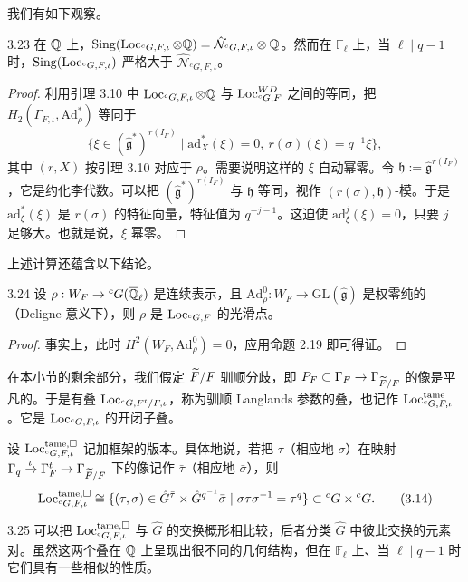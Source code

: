 我们有如下观察。
\begin{lem}{3.23}
在 $\mathbb{Q}$ 上，$\operatorname{Sing}(\operatorname{Loc}_{{}^{c}G,F,\iota}\otimes\mathbb{Q})=\hat{\mathcal N}_{{}^{c}G,F,\iota}\otimes\mathbb{Q}$。然而在 $\mathbb F_{\ell}$ 上，当 $\ell\mid q-1$ 时，$\operatorname{Sing}(\operatorname{Loc}_{{}^{c}G,F,\iota})$ 严格大于 $\hat{\mathcal N}_{{}^{c}G,F,\iota}$。
\end{lem}
\begin{proof}
利用引理 3.10 中 $\operatorname{Loc}_{{}^{c}G,F,\iota}\otimes\mathbb{Q}$ 与 $\operatorname{Loc}^{WD}_{{}^{c}G,F}$ 之间的等同，把 $H_{2}(\Gamma_{F,\iota},\mathrm{Ad}^{*}_{\rho})$ 等同于
\[
\{\xi\in(\hat{\mathfrak g}^{*})^{r(I_F)}\mid \mathrm{ad}^{*}_{X}(\xi)=0,\ r(\sigma)(\xi)=q^{-1}\xi\},
\]
其中 $(r,X)$ 按引理 3.10 对应于 $\rho$。需要说明这样的 $\xi$ 自动幂零。令 $\mathfrak h:=\hat{\mathfrak g}^{r(I_F)}$，它是约化李代数。可以把 $(\hat{\mathfrak g}^{*})^{r(I_F)}$ 与 $\mathfrak h$ 等同，视作 $(r(\sigma),\mathfrak h)$-模。于是 $\mathrm{ad}^{*}_{\xi}(\xi)$ 是 $r(\sigma)$ 的特征向量，特征值为 $q^{-j-1}$。这迫使 $\mathrm{ad}^{j}_{\xi}(\xi)=0$，只要 $j$ 足够大。也就是说，$\xi$ 幂零。
\end{proof}

上述计算还蕴含以下结论。
\begin{lem}{3.24}
设 $\rho:W_F\to{}^cG(\overline{\mathbb{Q}}_{\ell})$ 是连续表示，且 $\mathrm{Ad}^{0}_{\rho}:W_F\to\mathrm{GL}(\hat{\mathfrak g})$ 是权零纯的（Deligne 意义下），则 $\rho$ 是 $\operatorname{Loc}_{{}^{c}G,F}$ 的光滑点。
\end{lem}
\begin{proof}
事实上，此时 $H^{2}(W_F,\mathrm{Ad}^{0}_{\rho})=0$，应用命题 2.19 即可得证。
\end{proof}

在本小节的剩余部分，我们假定 $\widetilde F/F$ 驯顺分歧，即 $P_F\subset\Gamma_F\to\Gamma_{\widetilde F/F}$ 的像是平凡的。于是有叠 $\operatorname{Loc}_{{}^{c}G,F^{t}/F,\iota}$，称为驯顺 Langlands 参数的叠，也记作 $\operatorname{Loc}^{\mathrm{tame}}_{{}^{c}G,F,\iota}$。它是 $\operatorname{Loc}_{{}^{c}G,F,\iota}$ 的开闭子叠。

设 $\operatorname{Loc}^{\mathrm{tame},\square}_{{}^{c}G,F,\iota}$ 记加框架的版本。具体地说，若把 $\tau$（相应地 $\sigma$）在映射 $\Gamma_q\xrightarrow{\iota}\Gamma^{t}_F\to\Gamma_{\widetilde F/F}$ 下的像记作 $\bar\tau$（相应地 $\bar\sigma$），则
\begin{equation}
\operatorname{Loc}^{\mathrm{tame},\square}_{{}^{c}G,F,\iota}\cong\{(\tau,\sigma)\in\hat G^{\bar\tau}\times\hat G^{q^{-1}}\bar\sigma\mid \sigma\tau\sigma^{-1}=\tau^{q}\}\subset{}^cG\times{}^cG. \tag{3.14}
\end{equation}
\begin{rem}{3.25}
可以把 $\operatorname{Loc}^{\mathrm{tame},\square}_{{}^{c}G,F,\iota}$ 与 $\hat G$ 的交换概形相比较，后者分类 $\hat G$ 中彼此交换的元素对。虽然这两个叠在 $\mathbb{Q}$ 上呈现出很不同的几何结构，但在 $\mathbb F_{\ell}$ 上、当 $\ell\mid q-1$ 时它们具有一些相似的性质。
\end{rem}

